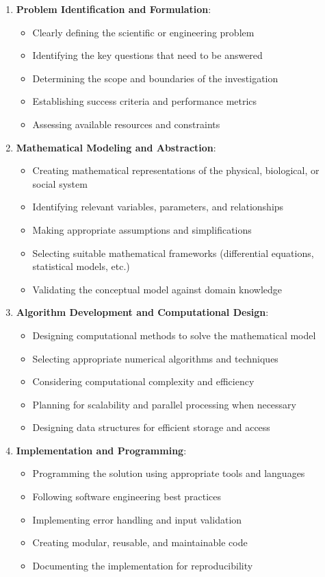 \begin{enumerate}
  \item \textbf{Problem Identification and Formulation}: 
  \begin{itemize}
    \item Clearly defining the scientific or engineering problem
    \item Identifying the key questions that need to be answered
    \item Determining the scope and boundaries of the investigation
    \item Establishing success criteria and performance metrics
    \item Assessing available resources and constraints
  \end{itemize}
      
  \item \textbf{Mathematical Modeling and Abstraction}: 
  \begin{itemize}
    \item Creating mathematical representations of the physical, biological, or social system
    \item Identifying relevant variables, parameters, and relationships
    \item Making appropriate assumptions and simplifications
    \item Selecting suitable mathematical frameworks (differential equations, statistical models, etc.)
    \item Validating the conceptual model against domain knowledge
  \end{itemize}
      
  \item \textbf{Algorithm Development and Computational Design}: 
  \begin{itemize}
    \item Designing computational methods to solve the mathematical model
    \item Selecting appropriate numerical algorithms and techniques
    \item Considering computational complexity and efficiency
    \item Planning for scalability and parallel processing when necessary
    \item Designing data structures for efficient storage and access
  \end{itemize}
      
  \item \textbf{Implementation and Programming}: 
  \begin{itemize}
    \item Programming the solution using appropriate tools and languages
    \item Following software engineering best practices
    \item Implementing error handling and input validation
    \item Creating modular, reusable, and maintainable code
    \item Documenting the implementation for reproducibility
  \end{itemize}
      

\end{enumerate}
